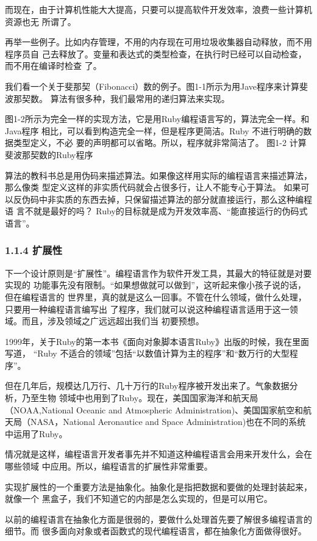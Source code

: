 \documentclass[color=cyan,mathpazo,titlestyle=hang]{elegantbook}
\begin{document}
而现在，由于计算机性能大大提高，只要可以提高软件开发效率，浪费一些计算机资源也无
所谓了。

再举一些例子。比如内存管理，不用的内存现在可用垃圾收集器自动释放，而不用程序员自
己去释放了。变量和表达式的类型检查，在执行时已经可以自动检查，而不用在编译时检查
了。

我们看一个关于斐那契（Fibonacci）数的例子。图1-1所示为用Jave程序来计算斐波那契数。
算法有很多种，我们最常用的递归算法来实现。

图1-2所示为完全一样的实现方法，它是用Ruby编程语言写的，算法完全一样。和Java程序
相比，可以看到构造完全一样，但是程序更简洁。Ruby 不进行明确的数据类型定义，不必
要的声明都可以省略。所以，程序就非常简洁了。
图1-2 计算斐波那契数的Ruby程序

算法的教科书总是用伪码来描述算法。如果像这样用实际的编程语言来描述算法，那么像类
型定义这样的非实质代码就会占很多行，让人不能专心于算法。
如果可以反伪码中非实质的东西去掉，只保留描述算法的部分就直接运行，那么这种编程语
言不就是最好的吗？ Ruby的目标就是成为开发效率高、“能直接运行的伪码式语言”。

\subsubsection{1.1.4 扩展性}
\label{sec:org7ccd920}

下一个设计原则是“扩展性”。编程语言作为软件开发工具，其最大的特征就是对要实现的
功能事先没有限制。“如果想做就可以做到”，这听起来像小孩子说的话，但在编程语言的
世界里，真的就是这么一回事。不管在什么领域，做什么处理，只要用一种编程语言编写出
了程序，我们就可以说这种编程语言适用于这一领域。而且，涉及领域之广远远超出我们当
初要预想。

1999年，关于Ruby的第一本书《面向对象脚本语言Ruby》出版的时候，我在里面写道，
“Ruby 不适合的领域”包括“以数值计算为主的程序”和“数万行的大型程序”。

但在几年后，规模达几万行、几十万行的Ruby程序被开发出来了。气象数据分析，乃至生物
领域中也用到了Ruby。现在，美国国家海洋和航天局（NOAA,National Oceanic and
Atmospheric Administration)、美国国家航空和航天局（NASA，National Aeronautice
and Space Administration)也在不同的系统中运用了Ruby。

情况就是这样，编程语言开发者事先并不知道这种编程语言会用来开发什么，会在哪些领域
中应用。所以，编程语言的扩展性非常重要。

实现扩展性的一个重要方法是抽象化。抽象化是指把数据和要做的处理封装起来，就像一个
黑盒子，我们不知道它的内部是怎么实现的，但是可以用它。

以前的编程语言在抽象化方面是很弱的，要做什么处理首先要了解很多编程语言的细节。而
很多面向对象或者函数式的现代编程语言，都在抽象化方面做得很好。
\end{document}
